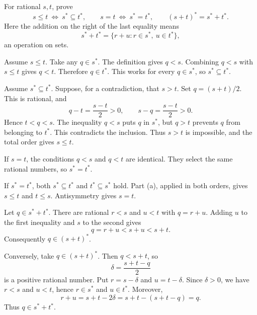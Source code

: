 
\goal For rational $s,t$, prove
\[
 s\le t\ \Longleftrightarrow\ s^*\subseteq t^*,\qquad
 s=t\ \Longleftrightarrow\ s^*=t^*,\qquad
 (s+t)^*=s^*+t^*.
\]
Here the addition on the right of the last equality means
\[
 s^*+t^*=\{r+u:r\in s^*,\ u\in t^*\},
\]
an operation on sets.

Assume $s\le t$. Take any $q\in s^*$. The definition gives $q<s$.
Combining $q<s$ with $s\le t$ gives $q<t$. Therefore $q\in t^*$.
This works for every $q\in s^*$, so $s^*\subseteq t^*$.

Assume $s^*\subseteq t^*$. Suppose, for a contradiction, that $s>t$.
Set $q=(s+t)/2$. This is rational, and
\[
 q-t=\frac{s-t}{2}>0,\qquad s-q=\frac{s-t}{2}>0.
\]
Hence $t<q<s$. The inequality $q<s$ puts $q$ in $s^*$, but $q>t$
prevents $q$ from belonging to $t^*$. This contradicts the inclusion.
Thus $s>t$ is impossible, and the total order gives $s\le t$.


If $s=t$, the conditions $q<s$ and $q<t$ are identical.
They select the same rational numbers, so $s^*=t^*$.

If $s^*=t^*$, both $s^*\subseteq t^*$ and $t^*\subseteq s^*$ hold.
Part (a), applied in both orders, gives $s\le t$ and $t\le s$.
Antisymmetry gives $s=t$.


Let $q\in s^*+t^*$. There are rational $r<s$ and $u<t$ with $q=r+u$.
Adding $u$ to the first inequality and $s$ to the second gives
\[
 q=r+u<s+u<s+t.
\]
Consequently $q\in(s+t)^*$.

Conversely, take $q\in(s+t)^*$. Then $q<s+t$, so
\[
 \delta=\frac{s+t-q}{2}
\]
is a positive rational number. Put $r=s-\delta$ and $u=t-\delta$.
Since $\delta>0$, we have $r<s$ and $u<t$, hence $r\in s^*$ and
$u\in t^*$. Moreover,
\[
 r+u=s+t-2\delta=s+t-(s+t-q)=q.
\]
Thus $q\in s^*+t^*$.

